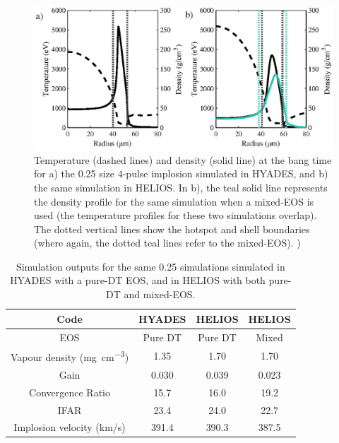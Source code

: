 \begin{figure} 
	\centering     %
	\includegraphics[width=.8\textwidth]{figures/FurtherSims/MixedEOS.eps}
	\caption{\label{fig:MixedEOS} Temperature (dashed lines) and density (solid line) at the bang time for a) the 0.25 size 4-pulse implosion simulated in HYADES, and b) the same simulation in HELIOS. In b), the teal solid line represents the density profile for the same simulation when a mixed-EOS is used (the temperature profiles for these two simulations overlap). The dotted vertical lines show the hotspot and shell boundaries (where again, the dotted teal lines refer to the mixed-EOS). )}
\end{figure}

\begin{table}
	\centering
	\begin{tabular}{|c|c|c|c|}
		\hline
		Code &  HYADES & HELIOS & HELIOS \\ 
		\hline
		EOS & Pure DT & Pure DT & Mixed \\
		\hline
		Vapour density (\unit{\milli\gram\per\centi\meter\cubed}) & 1.35 & 1.70 & 1.70 \\
		Gain & 0.030 & 0.039 & 0.023  \\
		Convergence Ratio & 15.7 & 16.0 & 19.2 \\ 
		IFAR & 23.4 & 24.0 & 22.7 \\ 
		Implosion velocity (km/s) & 391.4 & 390.3 & 387.5 \\
		\hline
	\end{tabular}
	\caption{Simulation outputs for the same 0.25 simulations simulated in HYADES with a pure-DT EOS, and in HELIOS with both pure-DT and mixed-EOS.}
	\label{tab:MixedEOS}
\end{table}

